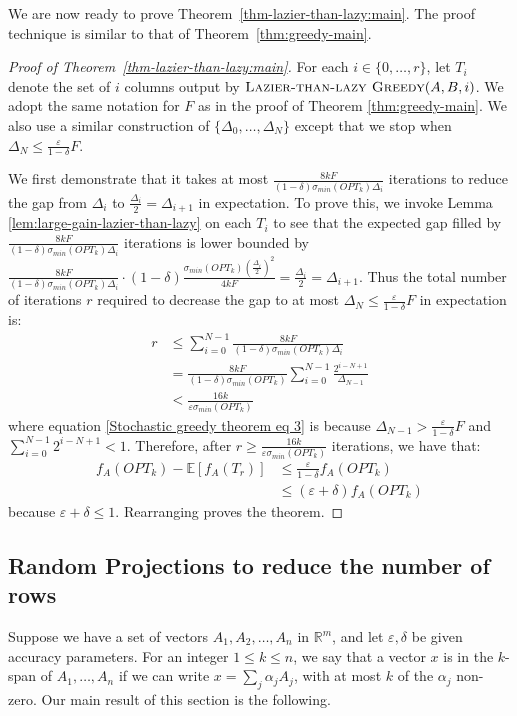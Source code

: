 \documentclass{article}
\newcommand{\eps}{\varepsilon}
\newcommand{\del}{\delta}
\newcommand{\re}{\mathbb{R}}
\newcommand{\ltlgreedy}{\textsc{Lazier-than-lazy Greedy}}
\begin{document}
We are now ready to prove Theorem~\ref{thm-lazier-than-lazy:main}. The proof technique is similar to that of Theorem~\ref{thm:greedy-main}.
\begin{proof}[Proof of Theorem~\ref{thm-lazier-than-lazy:main}]
For each $i \in \{0, \dots, r\}$, let $T_i$ denote the set of $i$ columns output by $\ltlgreedy(A, B, i)$. We adopt the same notation for $F$ as in the proof of Theorem \ref{thm:greedy-main}. We also use a similar construction of $\{\Delta_0, \dots, \Delta_N\}$ except that we stop when $\Delta_N \leq \frac{\eps}{1 - \delta}F$.

We first demonstrate that it takes at most $\frac{8kF}{(1 - \delta) \sigma_{min}(OPT_k) \Delta_i}$ iterations to reduce the gap from $\Delta_i$ to $\frac{\Delta_i}{2} = \Delta_{i+1}$ in expectation. To prove this, we invoke Lemma \ref{lem:large-gain-lazier-than-lazy} on each $T_i$ to see that the expected gap filled by $\frac{8kF}{(1 - \delta) \sigma_{min}(OPT_k) \Delta_i}$ iterations is lower bounded by $\frac{8kF}{(1 - \delta) \sigma_{min}(OPT_k) \Delta_i} \cdot  (1 - \delta) \frac{\sigma_{min}(OPT_k)(\frac{\Delta_i}{2})^2}{4kF} = \frac{\Delta_i}{2} = \Delta_{i+1}$. Thus the total number of iterations $r$ required to decrease the gap to at most $\Delta_N \leq \frac{\eps}{1 - \delta} F$ in expectation is:
\begin{align}
r
&\leq \sum_{i=0}^{N-1} \frac{8kF}{(1 - \delta)\sigma_{min}(OPT_k) \Delta_i}
\\ &= \frac{8kF}{(1 - \delta)\sigma_{min}(OPT_k)} \sum_{i=0}^{N-1} \frac{2^{i-N+1}}{\Delta_{N-1}} \label{Stochastic greedy theorem eq 2}
\\ &< \frac{16k}{\eps \sigma_{min}(OPT_k)} \label{Stochastic greedy theorem eq 3}
\end{align}
where equation \eqref{Stochastic greedy theorem eq 3} is because $\Delta_{N-1} > \frac{\eps}{1 - \delta} F$ and $\sum_{i=0}^{N-1} 2^{i-N+1} < 1$. Therefore, after $r \geq \frac{16k}{\eps \sigma_{min}(OPT_k)}$ iterations, we have that:
\begin{align}
f_A(OPT_k) - \mathbb{E}[f_A(T_r)] 
&\leq \frac{\eps}{1 - \delta} f_A(OPT_k) 
\\ &\leq (\eps + \delta)f_A(OPT_k)
\end{align}
because $\eps + \delta \leq 1$. Rearranging proves the theorem.
\end{proof}

\subsection{Random Projections to reduce the number of rows} \label{app:random-projections}
Suppose we have a set of vectors $A_1, A_2, \dots, A_n$ in
$\re^m$, and let $\eps, \del$ be given accuracy parameters. For an integer $1 \le k \le n$, we say that a vector $x$ is in the $k$-span of $A_1, \dots, A_n$ if we can write $x = \sum_j \alpha_j A_j$, with at most $k$ of the $\alpha_j$ non-zero. Our main result of this section is the following.
\end{document}
